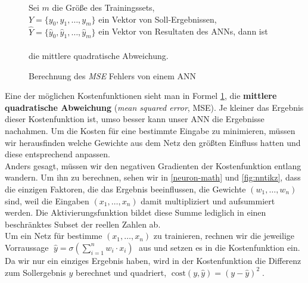                 \begin{figure}[H]
                    \begin{mdframed}
                        \noindent
                        Sei $m$ die Größe des Trainingssets,\\
                        \hspace*{4.5mm} $Y = \{y_0, y_1,\dotsc,y_m\}$ ein Vektor von Soll-Ergebnissen, \\
                        \hspace*{4.5mm} $\widehat{Y} = \{\widehat{y}_0, \widehat{y}_1,\dotsc,\widehat{y}_m\}$ ein Vektor von Resultaten des ANNs, dann ist\\[4mm]
                        \hspace*{30mm} \\[4mm]
                        die mittlere quadratische Abweichung.
                    \end{mdframed}
                    \formforfigure
                    \caption{\label{cost-math}Berechnung des \textit{MSE} Fehlers von einem ANN}
                \end{figure}
                \noindent
                Eine der möglichen Kostenfunktionen sieht man in Formel \ref{cost-math}, die \textbf{mittlere quadratische Abweichung} (\textit{mean squared error}, MSE). Je kleiner das Ergebnis dieser Kostenfunktion ist, umso besser kann unser ANN die Ergebnisse nachahmen. Um die Kosten für eine bestimmte Eingabe zu minimieren, müssen wir herausfinden welche Gewichte aus dem Netz den größten Einfluss hatten und diese entsprechend anpassen. \\

                \noindent
                Anders gesagt, müssen wir den negativen Gradienten der Kostenfunktion entlang wandern. Um ihn zu berechnen, sehen wir in \ref{neuron-math} und \ref{fig:nntikz}, dass die einzigen Faktoren, die das Ergebnis beeinflussen, die Gewichte $(w_1, \dotsc , w_n)$ sind, weil die Eingaben $(x_1, \dotsc , x_n)$ damit multipliziert und aufsummiert werden. Die Aktivierungsfunktion bildet diese Summe lediglich in einen beschränktes Subset der reellen Zahlen ab. \\

                \noindent
                Um ein Netz für bestimme $(x_1, \dotsc , x_n)$ zu trainieren, rechnen wir die jeweilige Vorraussage $\; \widehat{y} = \sigma(\sum^{n}_{i = 1} w_i \cdot x_i) \;$ aus und setzen es in die Kostenfunktion ein. Da wir nur ein einziges Ergebnis haben, wird in der Kostenfunktion die Differenz zum Sollergebnis $y$ berechnet und quadriert, $\; \text{cost}(y, \widehat{y}) = (y - \widehat{y})^2 \;$. \\

